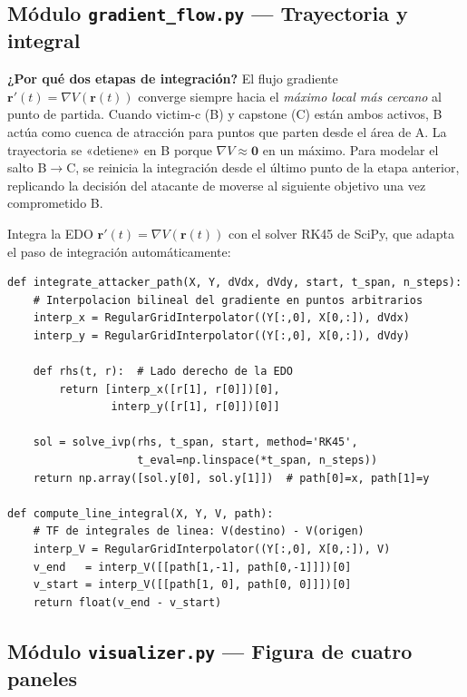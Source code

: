 \documentclass[12pt,a4paper]{article}
\newcommand{\grad}{\nabla}
\begin{document}
\subsection{Módulo \texttt{gradient\_flow.py} — Trayectoria y integral}

\begin{tcolorbox}[defbox]
  \textbf{¿Por qué dos etapas de integración?} El flujo gradiente
  $\mathbf{r}'(t) = \grad V(\mathbf{r}(t))$ converge siempre hacia el
  \emph{máximo local más cercano} al punto de partida. Cuando victim-c
  (B) y capstone (C) están ambos activos, B actúa como cuenca de
  atracción para puntos que parten desde el área de A. La trayectoria
  se «detiene» en B porque $\grad V \approx \mathbf{0}$ en un máximo.
  Para modelar el salto B$\to$C, se reinicia la integración desde el
  último punto de la etapa anterior, replicando la decisión del atacante
  de moverse al siguiente objetivo una vez comprometido B.
\end{tcolorbox}

Integra la EDO $\mathbf{r}'(t) = \grad V(\mathbf{r}(t))$ con el
solver RK45 de SciPy, que adapta el paso de integración automáticamente:

\begin{lstlisting}[caption={Integración numérica del flujo gradiente con RK45.}]
def integrate_attacker_path(X, Y, dVdx, dVdy, start, t_span, n_steps):
    # Interpolacion bilineal del gradiente en puntos arbitrarios
    interp_x = RegularGridInterpolator((Y[:,0], X[0,:]), dVdx)
    interp_y = RegularGridInterpolator((Y[:,0], X[0,:]), dVdy)

    def rhs(t, r):  # Lado derecho de la EDO
        return [interp_x([r[1], r[0]])[0],
                interp_y([r[1], r[0]])[0]]

    sol = solve_ivp(rhs, t_span, start, method='RK45',
                    t_eval=np.linspace(*t_span, n_steps))
    return np.array([sol.y[0], sol.y[1]])  # path[0]=x, path[1]=y

def compute_line_integral(X, Y, V, path):
    # TF de integrales de linea: V(destino) - V(origen)
    interp_V = RegularGridInterpolator((Y[:,0], X[0,:]), V)
    v_end   = interp_V([[path[1,-1], path[0,-1]]])[0]
    v_start = interp_V([[path[1, 0], path[0, 0]]])[0]
    return float(v_end - v_start)
\end{lstlisting}

\subsection{Módulo \texttt{visualizer.py} — Figura de cuatro paneles}
\end{document}
